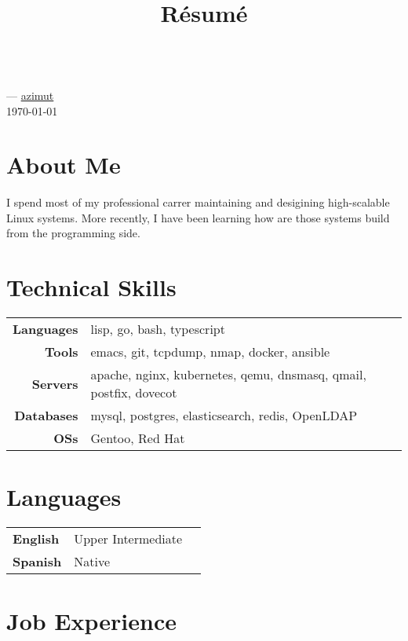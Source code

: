 \documentclass[11pt]{article}
\renewcommand{\maketitle}{
  \begin{center}{\huge\bfseries\theauthor} \\
    \vspace{.25em}
    {\faEnvelope} \href {mailto:\MAILTO} {\expandafter\randomize\expandafter{\MAILTO}}
    ---
    {\faGithub} \href {https://github.com/azimut} {azimut} \\
    \vspace{.25em}
    \today
  \end{center}
}
\begin{document}
\title{R\'esum\'e}
\author{\FULLNAME}

\maketitle


\section{About Me}

I spend most of my professional carrer maintaining and desigining high-scalable Linux systems. More recently, I have been learning how are those systems build from the programming side.


\section{Technical Skills}


\begin{tabular}{@{}rll@{}}
  \hspace{.1em} \textbf{Languages} & lisp, go, bash, typescript \\
  \hspace{.1em} \textbf{Tools}     & emacs, git, tcpdump, nmap, docker, ansible \\
  \hspace{.1em} \textbf{Servers}   & apache, nginx, kubernetes, qemu, dnsmasq, qmail, postfix, dovecot \\
  \hspace{.1em} \textbf{Databases} & mysql, postgres, elasticsearch, redis, OpenLDAP \\
  \hspace{.1em} \textbf{OSs}       & Gentoo, Red Hat
\end{tabular}


\section{Languages}


\begin{tabular}{@{}lll@{}}
  \hspace{.1em} \textbf{English} & Upper Intermediate \\
  \hspace{.1em} \textbf{Spanish} & Native \\
\end{tabular}


\section{Job Experience}
\end{document}
